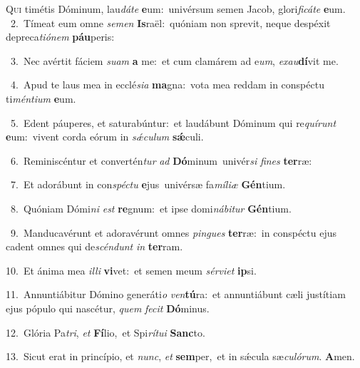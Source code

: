 \lettrine{\initial\textcolor{\initialcolor}{Q}}{ui} timétis Dóminum, lau\-\textit{dá}\-\textit{te} \textbf{e}\-um:~\star univérsum semen Jacob, glori\-\textit{fi}\-\textit{cá}\textit{te} \textbf{e}\-um.\\
{\numbfont\textcolor{\numbcolor}{~2.}}~Tímeat eum omne \textit{se}\-\textit{men} \textbf{Is}\-raël:~\star quóniam non sprevit, neque despéxit depreca\-\textit{ti}\-\textit{ó}\textit{nem} \textbf{páu}\-peris:\par
{\numbfont\textcolor{\numbcolor}{~3.}}~Nec avértit fáciem \textit{su}\-\textit{am} \textbf{a} me:~\star et cum clamárem ad e\-\textit{um}\-, \textit{ex}\-\textit{au}\textbf{dí}vit me.\par
{\numbfont\textcolor{\numbcolor}{~4.}}~Apud te laus mea in ecclé\-\textit{si}\-\textit{a} \textbf{ma}\-gna:~\star vota mea reddam in conspéctu ti\-\textit{mén}\-\textit{ti}\textit{um} \textbf{e}\-um.\par
{\numbfont\textcolor{\numbcolor}{~5.}}~Edent páuperes, et saturabúntur:~\dagger et laudábunt Dóminum qui re\-\textit{quí}\-\textit{runt} \textbf{e}\-um:~\star vivent corda eórum in \textit{sǽ}\-\textit{cu}\textit{lum} \textbf{sǽ}\-culi.\par
{\numbfont\textcolor{\numbcolor}{~6.}}~Reminiscéntur et convertén\textit{tur} \textit{ad} \textbf{Dó}\-minum~\star univér\textit{si} \textit{fi}\-\textit{nes} \textbf{ter}\-ræ:\par
{\numbfont\textcolor{\numbcolor}{~7.}}~Et adorábunt in con\-\textit{spéc}\-\textit{tu} \textbf{e}\-jus~\star univérsæ fa\-\textit{mí}\-\textit{li}\textit{æ} \textbf{Gén}\-tium.\par
{\numbfont\textcolor{\numbcolor}{~8.}}~Quóniam Dómi\textit{ni} \textit{est} \textbf{re}\-gnum:~\star et ipse domi\-\textit{ná}\-\textit{bi}\textit{tur} \textbf{Gén}\-tium.\par
{\numbfont\textcolor{\numbcolor}{~9.}}~Manducavérunt et adoravérunt omnes \textit{pin}\-\textit{gues} \textbf{ter}\-ræ:~\star in conspéctu ejus cadent omnes qui de\-\textit{scén}\-\textit{dunt} \textit{in} \textbf{ter}\-ram.\par
{\numbfont\textcolor{\numbcolor}{10.}}~Et ánima mea \textit{il}\-\textit{li} \textbf{vi}\-vet:~\star et semen meum \textit{sér}\-\textit{vi}\textit{et} \textbf{ip}\-si.\par
{\numbfont\textcolor{\numbcolor}{11.}}~Annuntiábitur Dómino generáti\textit{o} \textit{ven}\-\textbf{tú}ra:~\star et annuntiábunt cæli justítiam ejus pópulo qui nascétur, \textit{quem} \textit{fe}\-\textit{cit} \textbf{Dó}\-minus.\par
{\numbfont\textcolor{\numbcolor}{12.}}~Glória Pa\-\textit{tri}\-, \textit{et} \textbf{Fí}\-lio,~\star et Spi\-\textit{rí}\-\textit{tu}\textit{i} \textbf{Sanc}\-to.\par
{\numbfont\textcolor{\numbcolor}{13.}}~Sicut erat in princípio, et \textit{nunc}\-, \textit{et} \textbf{sem}\-per,~\star et in sǽcula sæ\-\textit{cu}\-\textit{ló}\textit{rum}. \textbf{A}\-men.\par
